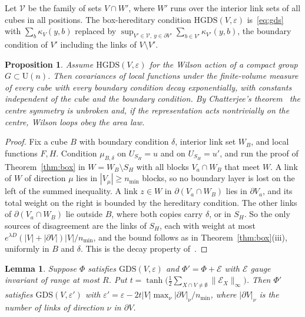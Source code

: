 \documentclass[aps,prd,twocolumn,superscriptaddress,nofootinbib,longbibliography,floatfix,amsmath,amssymb,10pt]{revtex4-2}
\newtheorem{lemma}[theorem]{Lemma}
\newtheorem{proposition}[theorem]{Proposition}
\theoremstyle{definition}
\theoremstyle{remark}
\newcommand{\U}{\mathrm{U}}
\begin{document}
Let $\mathcal V$ be the family of sets $V\cap W'$, where $W'$ runs over the
interior link sets of all cubes in all positions. The box-hereditary
condition $\mathrm{HGDS}(V,\varepsilon)$ is~\eqref{eq:gds} with
$\sum_b\kappa_V(y,b)$ replaced by $\sup_{V'\in\mathcal V,\ y\in\partial V'}
\sum_{b\in V'}\kappa_{V'}(y,b)$, the boundary condition of $V'$ including the
links of $V\setminus V'$.

\begin{proposition}\label{prop:hgds}
Assume $\mathrm{HGDS}(V,\varepsilon)$ for the Wilson action of a compact
group $G\subset\U(n)$. Then covariances of local functions under the
finite-volume measure of every cube with every boundary condition decay
exponentially, with constants independent of the cube and the boundary
condition. By Chatterjee's theorem~\cite[Thm.~2.4]{Cha21} the centre
symmetry is unbroken and, if the representation acts nontrivially on the
centre, Wilson loops obey the area law.
\end{proposition}

\begin{proof}
Fix a cube $B$ with boundary condition $\delta$, interior link set $W_B$, and
local functions $F,H$. Condition $\mu_{B,\delta}$ on $U_{S_H}=u$ and on
$U_{S_H}=u'$, and run the proof of Theorem~\ref{thm:box} in
$W=W_B\setminus S_H$ with all blocks $V_a\cap W_B$ that meet $W$. A link of
$W$ of direction $\mu$ lies in $|V_\mu|\ge n_{\min}$ blocks, so no boundary
layer is lost on the left of the summed inequality. A link $z\in W$ in
$\partial(V_a\cap W_B)$ lies in $\partial V_a$, and its total weight on the
right is bounded by the hereditary condition. The other links of
$\partial(V_a\cap W_B)$ lie outside $B$, where both copies carry $\delta$, or in
$S_H$. So the only sources of disagreement are the links of $S_H$, each with
weight at most $e^{\lambda D}(|V|+|\partial V|)|V|/n_{\min}$, and the bound
follows as in Theorem~\ref{thm:box}(iii), uniformly in $B$ and $\delta$. This
is the decay property of~\cite[Def.~2.3]{Cha21}.
\end{proof}

\begin{lemma}\label{lem:stability}
Suppose $\Phi$ satisfies $\mathrm{GDS}(V,\varepsilon)$ and $\Phi'=\Phi+
\mathcal E$ with $\mathcal E$ gauge invariant of range at most $R$. Put
$t=\tanh\bigl(\frac12\sum_{X\cap V\ne\emptyset}\|\mathcal E_X\|_\infty\bigr)$.
Then $\Phi'$ satisfies $\mathrm{GDS}(V,\varepsilon')$ with
$\varepsilon'=\varepsilon-2t|V|\max_\nu|\partial V|_\nu/n_{\min}$, where
$|\partial V|_\nu$ is the number of links of direction $\nu$ in $\partial V$.
\end{lemma}
\end{document}
